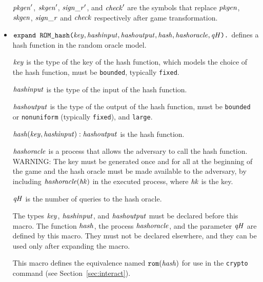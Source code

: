 \documentclass{article}
\begin{document}
\begin{itemize}
  $\mathit{pkgen}'$, $\mathit{skgen}'$, $\mathit{sign\_r}'$, and $\mathit{check}'$ are the symbols that replace $\mathit{pkgen}$, $\mathit{skgen}$, $\mathit{sign\_r}$ and $\mathit{check}$ respectively after game transformation.

\item $\texttt{expand ROM\_hash(}\mathit{key}, \mathit{hashinput}, \mathit{hashoutput}, \mathit{hash}, \mathit{hashoracle}, \mathit{qH}\texttt{).}$
defines a hash function in the random oracle model.

$\mathit{key}$ is the type of the key of the hash function, which models
the choice of the hash function, must be \texttt{bounded}, typically 
\texttt{fixed}.

   $\mathit{hashinput}$ is the type of the input of the hash function.

   $\mathit{hashoutput}$ is the type of the output of the hash function, must be \texttt{bounded} or \texttt{nonuniform} (typically \texttt{fixed}), and \texttt{large}.

   $\mathit{hash}(\mathit{key}, \mathit{hashinput}): \mathit{hashoutput}$ is the hash function.

    $\mathit{hashoracle}$ is a process that allows the adversary to call the hash function.
    WARNING: The key must be generated once and for all at the beginning of the game 
   and the hash oracle must be made available to the adversary,
    by including $\mathit{hashoracle}(\mathit{hk})$ in the executed process,
    where $\mathit{hk}$ is the key.

    $\mathit{qH}$ is the number of queries to the hash oracle.

    The types $\mathit{key}$, $\mathit{hashinput}$, and $\mathit{hashoutput}$ must
    be declared before this macro.  The function $\mathit{hash}$, the
    process $\mathit{hashoracle}$, and the parameter $\mathit{qH}$ are defined
    by this macro. They must not be declared elsewhere, and they can
    be used only after expanding the macro.

   This macro defines the equivalence named $\texttt{rom}(\mathit{hash})$
   for use in the \texttt{crypto} command 
   (see Section~\ref{sec:interact}).


\end{itemize}
\end{document}
